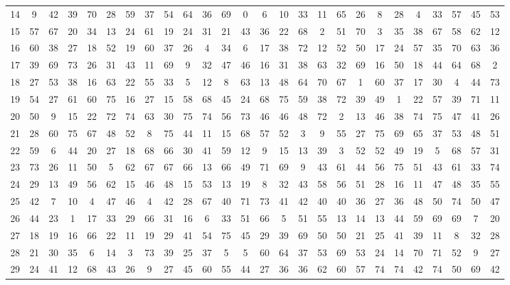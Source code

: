 \begin{table}
\begin{tabular}{c c c c c c c c c c c c c c c c c c c c c c c c c c }
14 & 9 & 42 & 39 & 70 & 28 & 59 & 37 & 54 & 64 & 36 & 69 & 0 & 6 & 10 & 33 & 11 & 65 & 26 & 8 & 28 & 4 & 33 & 57 & 45 & 53 \\
15 & 57 & 67 & 20 & 34 & 13 & 24 & 61 & 19 & 24 & 31 & 21 & 43 & 36 & 22 & 68 & 2 & 51 & 70 & 3 & 35 & 38 & 67 & 58 & 62 & 12 \\
16 & 60 & 38 & 27 & 18 & 52 & 19 & 60 & 37 & 26 & 4 & 34 & 6 & 17 & 38 & 72 & 12 & 52 & 50 & 17 & 24 & 57 & 35 & 70 & 63 & 36 \\
17 & 39 & 69 & 73 & 26 & 31 & 43 & 11 & 69 & 9 & 32 & 47 & 46 & 16 & 31 & 38 & 63 & 32 & 69 & 16 & 50 & 18 & 44 & 64 & 68 & 2 \\
18 & 27 & 53 & 38 & 16 & 63 & 22 & 55 & 33 & 5 & 12 & 8 & 63 & 13 & 48 & 64 & 70 & 67 & 1 & 60 & 37 & 17 & 30 & 4 & 44 & 73 \\
19 & 54 & 27 & 61 & 60 & 75 & 16 & 27 & 15 & 58 & 68 & 45 & 24 & 68 & 75 & 59 & 38 & 72 & 39 & 49 & 1 & 22 & 57 & 39 & 71 & 11 \\
20 & 50 & 9 & 15 & 22 & 72 & 74 & 63 & 30 & 75 & 74 & 56 & 73 & 46 & 46 & 48 & 72 & 2 & 13 & 46 & 38 & 74 & 75 & 47 & 41 & 26 \\
21 & 28 & 60 & 75 & 67 & 48 & 52 & 8 & 75 & 44 & 11 & 15 & 68 & 57 & 52 & 3 & 9 & 55 & 27 & 75 & 69 & 65 & 37 & 53 & 48 & 51 \\
22 & 59 & 6 & 44 & 20 & 27 & 18 & 68 & 66 & 30 & 41 & 59 & 12 & 9 & 15 & 13 & 39 & 3 & 52 & 52 & 49 & 19 & 5 & 68 & 57 & 31 \\
23 & 73 & 26 & 11 & 50 & 5 & 62 & 67 & 67 & 66 & 13 & 66 & 49 & 71 & 69 & 9 & 43 & 61 & 44 & 56 & 75 & 51 & 43 & 61 & 33 & 74 \\
24 & 29 & 13 & 49 & 56 & 62 & 15 & 46 & 48 & 15 & 53 & 13 & 19 & 8 & 32 & 43 & 58 & 56 & 51 & 28 & 16 & 11 & 47 & 48 & 35 & 55 \\
25 & 42 & 7 & 10 & 4 & 47 & 46 & 4 & 42 & 28 & 67 & 40 & 71 & 73 & 41 & 42 & 40 & 40 & 36 & 27 & 36 & 48 & 50 & 74 & 50 & 47 \\
26 & 44 & 23 & 1 & 17 & 33 & 29 & 66 & 31 & 16 & 6 & 33 & 51 & 66 & 5 & 51 & 55 & 13 & 14 & 13 & 44 & 59 & 69 & 69 & 7 & 20 \\
27 & 18 & 19 & 16 & 66 & 22 & 11 & 19 & 29 & 41 & 54 & 75 & 45 & 29 & 39 & 69 & 50 & 50 & 21 & 25 & 41 & 39 & 11 & 8 & 32 & 28 \\
28 & 21 & 30 & 35 & 6 & 14 & 3 & 73 & 39 & 25 & 37 & 5 & 5 & 60 & 64 & 37 & 53 & 69 & 53 & 24 & 14 & 70 & 71 & 52 & 9 & 27 \\
29 & 24 & 41 & 12 & 68 & 43 & 26 & 9 & 27 & 45 & 60 & 55 & 44 & 27 & 36 & 36 & 62 & 60 & 57 & 74 & 74 & 42 & 74 & 50 & 69 & 42 \\

\end{tabular}
\end{table}
